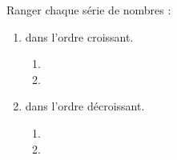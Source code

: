 \begin{colonne*exercice}

\begin{exercice}
   Ranger chaque série de nombres :
   \begin{enumerate}
      \item dans l'ordre croissant. \smallskip
      \begin{enumerate}
         \item {} \;  \;  \;  \;  \;  \smallskip
         \item {} \;  \;  \;  \;  \; 
      \end{enumerate}
      \item dans l'ordre décroissant. \smallskip
      \begin{enumerate}
         \item {} \;  \;  \;  \;  \;  \smallskip
         \item {} \;  \;  \;  \;  \; 
      \end{enumerate}
   \end{enumerate}
\end{exercice}



\end{colonne*exercice}
